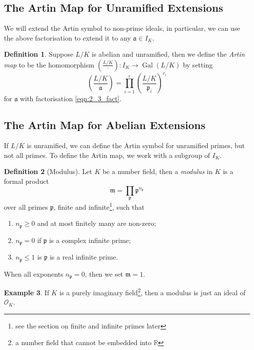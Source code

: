 \documentclass[11pt]{article}
\theoremstyle{definition}
\newtheorem{definition}{Definition}[section]
\newtheorem{example}[definition]{Example}
\theoremstyle{plain}
\theoremstyle{remark}
\DeclareMathOperator{\Gal}{Gal}
\newcommand{\RR}{\mathbb{R}}
\newcommand{\cO}{\mathcal{O}}
\newcommand{\fa}{\mathfrak{a}}
\newcommand{\fp}{\mathfrak{p}}
\newcommand{\fm}{\mathfrak{m}}
\newcommand{\leg}[2]{\left(\frac{#1}{#2}\right)}
\begin{document}
\subsection{The Artin Map for Unramified Extensions}
We will extend the Artin symbol to non-prime ideals, in particular, we can use the above factorisation to extend it to any $\fa \in I_K$.

\begin{definition}\label{def:2_4}
    Suppose $L/K$ is abelian and unramified, then we define the \emph{Artin map} to be the homomorphism $\leg{L/K}{\cdot} : I_K \to \Gal(L/K)$ by setting
    \begin{equation}\label{eqn:2_4_star}
        \leg{L/K}{\fa} = \prod_{i=1}^r \leg{L/K}{\fp_i}^{r_i}
    \end{equation}
    for $\fa$ with factorisation \eqref{eqn:2_3_fact}.
\end{definition}

\subsection{The Artin Map for Abelian Extensions}

If $L/K$ is unramified, we can define the Artin symbol for unramified primes, but not all primes. To define the Artin map, we work with a subgroup of $I_K$.

\begin{definition}[Modulus]\label{def:2_5}
    Let $K$ be a number field, then a \emph{modulus} in $K$ is a formal product
    \begin{equation*}
        \fm = \prod_\fp \fp^{n_\fp}
    \end{equation*}
    over all primes $\fp$, finite and infinite\footnote{see the section on finite and infinite primes later}, such that
    \begin{enumerate}
        \item $n_\fp \ge 0$ and at most finitely many are non-zero;
        \item $n_\fp = 0$ if $\fp$ is a complex infinite prime;
        \item $n_\fp \le 1$ is $\fp$ is a real infinite prime.
    \end{enumerate}
    When all exponents $n_\fp = 0$, then we set $\fm = 1$.
\end{definition}

\begin{example}\label{eg:2_6}
    If $K$ is a purely imaginary field\footnote{a number field that cannot be embedded into $\RR$}, then a modulus is just an ideal of $\cO_K$.
\end{example}
\end{document}
